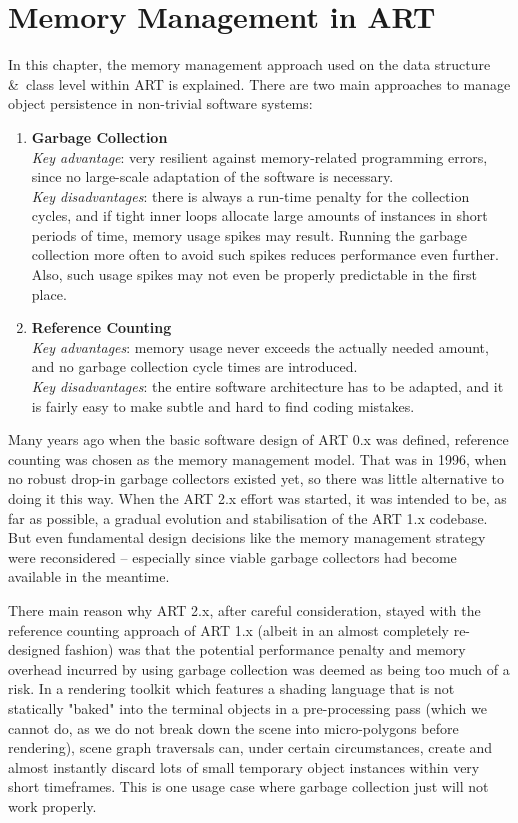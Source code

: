 \chapter{Memory Management in ART}
\label{sec:ARTmemorymanagement}
In this chapter, the memory management approach used on the data structure \&~class level within ART is explained. There are two main approaches to manage object persistence in non-trivial software systems:
\begin{enumerate}
\item \textbf{Garbage Collection} \\ \textit{Key advantage}: very resilient against memory-related programming errors, since no large-scale adaptation of the software is necessary. \\ \textit{Key disadvantages}: there is always a run-time penalty for the collection cycles, and if tight inner loops allocate large amounts of instances in short periods of time, memory usage spikes may result. Running the garbage collection more often to avoid such spikes reduces performance even further. Also, such usage spikes may not even be properly predictable in the first place.
\item \textbf{Reference Counting} \\ \textit{Key advantages}: memory usage never exceeds the actually needed amount, and no garbage collection cycle times are introduced. \\ \textit{Key disadvantages}: the entire software architecture has to be adapted, and it is fairly easy to make subtle and hard to find coding mistakes.
\end{enumerate}

Many years ago when the basic software design of ART 0.x was defined, reference counting was chosen as the memory management model. That was in 1996, when no robust drop-in garbage collectors existed yet, so there was little alternative to doing it this way. When the ART 2.x effort was started, it was intended to be, as far as possible, a gradual evolution and stabilisation of the ART 1.x codebase. But even fundamental design decisions like the memory management strategy were reconsidered -- especially since viable garbage collectors had become available in the meantime. 

There main reason why ART 2.x, after careful consideration, stayed with the reference counting approach of ART 1.x (albeit in an almost completely re-designed fashion) was that the potential performance penalty and memory overhead incurred by using garbage collection was deemed as being too much of a risk. In a rendering toolkit which features a shading language that is not statically "baked" into the terminal objects in a pre-processing pass (which we cannot do, as we do not break down the scene into micro-polygons before rendering), scene graph traversals can, under certain circumstances, create and almost instantly discard lots of small temporary object instances within very short timeframes. This is one usage case where garbage collection just will not work properly.

